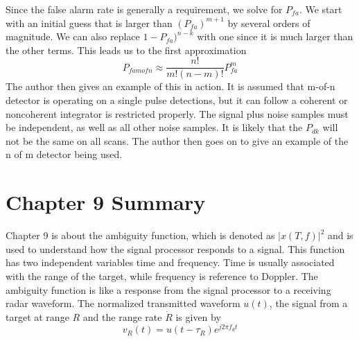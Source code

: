 \documentclass[12pt]{article}
\begin{document}
Since the false alarm rate is generally a requirement, we solve for $P_{fa}$. We start with an initial guess that is larger than $(P_{fa})^{m+1}$ by several orders of magnitude. We can also replace $1-P_{fa})^{n-k}$ with one since it is much larger than the other terms. This leads us to the first approximation
\begin{equation}
    P_{famofn} \approx \frac{n!}{m!(n-m)!} P_{fa}^{m}
\end{equation}
The author then gives an example of this in action. It is assumed that m-of-n detector is operating on a single pulse detections, but it can follow a coherent or noncoherent integrator is restricted properly. The signal plus noise samples must be independent, as well as all other noise samples. It is likely that the $P_{dk}$ will not be the same on all scans. The author then goes on to give an example of the n of m detector being used. 

\section{Chapter 9 Summary}
Chapter 9 is about the ambiguity function, which is denoted as $|x(T, f)|^2$ and is used to understand how the signal processor responds to a signal. This function has two independent variables time and frequency. Time is usually associated with the range of the target, while frequency is reference to Doppler. The ambiguity function is like a response from the signal processor to a receiving radar waveform. The normalized transmitted waveform $u(t)$, the signal from a target at range $R$ and the range rate $\dot{R}$ is given by 
\begin{equation}
    v_R(t) = u(t-\tau_R) e^{j2\pi f_d t}
\end{equation}
\end{document}
